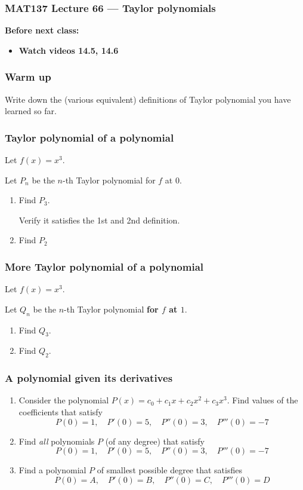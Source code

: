 \documentclass[14pt]{beamer}
\newcommand{\setsize}[1]{\fontsize{#1}{#1}\selectfont} %
\newcommand{\smallerfont}{\setsize{13}} %
\newcommand{\vvv}{\vspace{.2cm}}
\begin{document}
\begin{frame}
	\frametitle{MAT137 Lecture 66 --- Taylor polynomials }

	\vfill
	{\bf Before next class:}
		\begin{itemize} \normalsize
			\item {\bf Watch videos 14.5, 14.6}
		\end{itemize}
\end{frame}


	\begin{frame}[t]
		\frametitle{Warm up}

		Write down the (various equivalent) definitions of Taylor polynomial you
		have learned so far.
	\end{frame}

	\begin{frame}[t]
		\frametitle{Taylor polynomial of a polynomial}

		Let $f(x) = x^{3}$.

		Let $P_{n}$ be the $n$-th Taylor polynomial for $f$ at $0$. \vvv

		\begin{enumerate}
			\item Find $P_3$.

				Verify it satisfies the 1st and 2nd definition. \vvv 

			\item Find $P_{2}$ 
		\end{enumerate}
	\end{frame}

	\begin{frame}[t]
		\frametitle{More Taylor polynomial of a polynomial}

		Let $f(x) = x^{3}$.

		Let $Q_{n}$ be the $n$-th Taylor polynomial {\bf for $f$ at $1$}. \vvv

		\begin{enumerate}
			\item Find $Q_3$.
			\item Find $Q_2$.
		\end{enumerate}
	\end{frame}

	\begin{frame}[t]
		\smallerfont
		\frametitle{A polynomial given its derivatives}

		\begin{enumerate}
			\item Consider the polynomial ${\displaystyle P(x)= c_0 + c_1 x + c_2 x^2 + c_3 x^3}$.
				Find values of the coefficients that satisfy
				\[
					P(0) = 1, \quad P'(0) = 5, \quad P''(0) = 3, \quad P'''(0) = -7
				\]

			\item Find \emph{all} polynomials $P$ (of any degree) that satisfy
				\[
					P(0) = 1, \quad P'(0) = 5, \quad P''(0) = 3, \quad P'''(0) = -7
				\]

			\item Find a polynomial $P$ of smallest possible degree that satisfies
				\[
					P(0) = A, \quad P'(0) = B, \quad P''(0) = C, \quad P'''(0) = D
				\]
		\end{enumerate}
	\end{frame}
\end{document}
